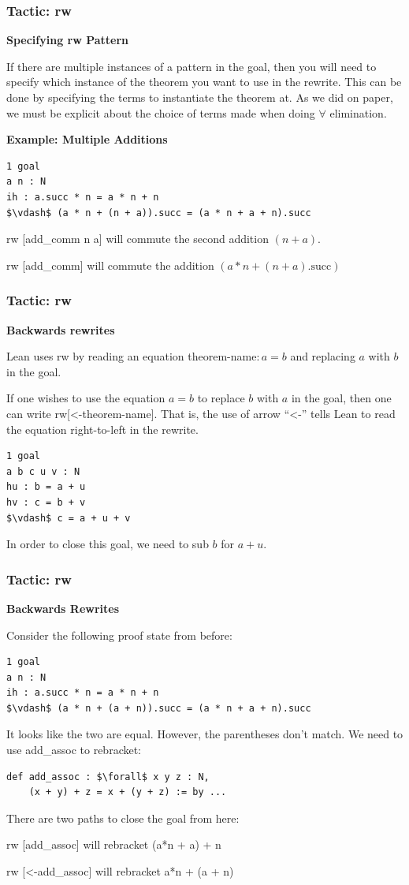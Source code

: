 \documentclass{beamer}
\theoremstyle{indentDefn} \newtheorem{defn}[]{Definition}
\begin{document}
\begin{frame}[fragile]
	\frametitle{Tactic: rw}
	
	\textbf{Specifying rw Pattern}	

	If there are multiple instances of a pattern in the goal, then you will need to specify which instance of the theorem you want to use in the rewrite. This can be done by specifying the terms to instantiate the theorem at. As we did on paper, we must be explicit about the choice of terms made when doing $\forall$ elimination.
	
{\bf Example: Multiple Additions}
	
{\footnotesize\begin{lstlisting}
1 goal
a n : N
ih : a.succ * n = a * n + n
$\vdash$ (a * n + (n + a)).succ = (a * n + a + n).succ	
\end{lstlisting}}

rw [add\_comm n a] will commute the second addition $(n + a)$. 

rw [add\_comm] will commute the addition $(a*n + (n + a).\text{succ})$

\end{frame}

\begin{frame}[fragile]
	\frametitle{Tactic: rw}
	
	\textbf{Backwards rewrites}
	
	Lean uses rw by reading an equation theorem-name$ : a=b$ and replacing $a$ with $b$ in the goal. 
	
	If one wishes to use the equation $a=b$ to replace $b$ with $a$ in the goal, then one can write rw[<-theorem-name]. That is, the use of arrow ``<-'' tells Lean to read the equation right-to-left in the rewrite.
	
	\begin{lstlisting}
1 goal
a b c u v : N
hu : b = a + u
hv : c = b + v
$\vdash$ c = a + u + v		
	\end{lstlisting}
In order to close this goal, we need to sub $b$ for $a+u$.
	
\end{frame}

\begin{frame}[fragile]
	\frametitle{Tactic: rw}
	
	{\bf Backwards Rewrites}
	
	Consider the following proof state from before:	
	\begin{lstlisting}
1 goal
a n : N
ih : a.succ * n = a * n + n
$\vdash$ (a * n + (a + n)).succ = (a * n + a + n).succ		
	\end{lstlisting}
It looks like the two are equal. However, the parentheses don't match. We need to use add\_assoc to rebracket: 
{\footnotesize\begin{lstlisting}
def add_assoc : $\forall$ x y z : N, 
	(x + y) + z = x + (y + z) := by ...
\end{lstlisting}}
There are two paths to close the goal from here: 

rw [add\_assoc] will rebracket (a*n + a) + n

rw [<-add\_assoc] will rebracket a*n + (a + n)
\end{frame}
\end{document}
